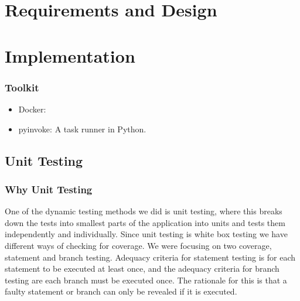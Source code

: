 \documentclass[11pt,a4paper]{report}
\begin{document}
\chapter{Requirements and Design}


\chapter{Implementation}

\subsection{Toolkit}

\begin{itemize}
  \item Docker:
  \item pyinvoke: A task runner in Python.
\end{itemize}

\section{Unit Testing}

\subsection{Why Unit Testing}
One of the dynamic testing methods we did is unit testing, where this breaks down the tests into smallest parts of the application into units and tests them independently and individually. Since unit testing is white box testing we have different ways of checking for coverage. We were focusing on two coverage, statement and branch testing. Adequacy criteria for statement testing is for each statement to be executed at least once, and the adequacy criteria for branch testing are each branch must be executed once. The rationale for this is that a faulty statement or branch can only be revealed if it is executed. 
\end{document}
